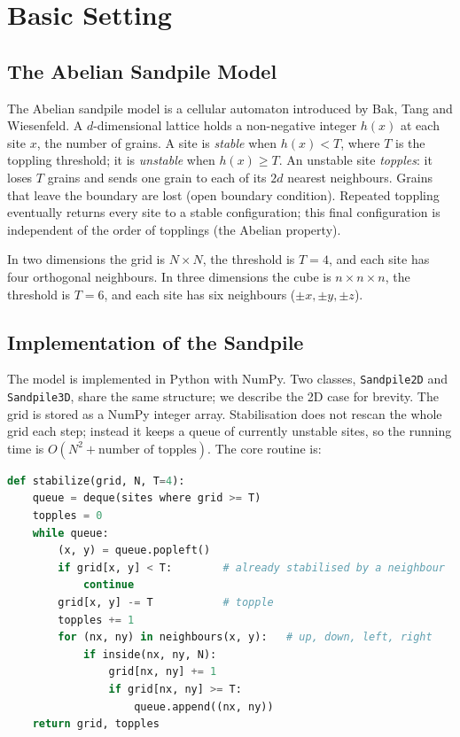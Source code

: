 \documentclass[main.tex]{subfiles}
\begin{document}
\pagestyle{plain}
\setcounter{chapter}{0}

\chapter{Basic Setting}
\label{chap:basic-setting}

\section{The Abelian Sandpile Model}

The Abelian sandpile model is a cellular automaton introduced by Bak, Tang and Wiesenfeld. A $d$-dimensional lattice holds a non-negative integer $h(x)$ at each site $x$, the number of grains. A site is \emph{stable} when $h(x) < T$, where $T$ is the toppling threshold; it is \emph{unstable} when $h(x) \ge T$. An unstable site \emph{topples}: it loses $T$ grains and sends one grain to each of its $2d$ nearest neighbours. Grains that leave the boundary are lost (open boundary condition). Repeated toppling eventually returns every site to a stable configuration; this final configuration is independent of the order of topplings (the Abelian property).

In two dimensions the grid is $N \times N$, the threshold is $T=4$, and each site has four orthogonal neighbours. In three dimensions the cube is $n \times n \times n$, the threshold is $T=6$, and each site has six neighbours ($\pm x,\pm y,\pm z$).

\section{Implementation of the Sandpile}
\label{sec:impl-sandpile}

The model is implemented in Python with NumPy. Two classes, \texttt{Sandpile2D} and \texttt{Sandpile3D}, share the same structure; we describe the 2D case for brevity. The grid is stored as a NumPy integer array. Stabilisation does not rescan the whole grid each step; instead it keeps a queue of currently unstable sites, so the running time is $O(N^2 + \text{number of topples})$. The core routine is:

\begin{lstlisting}[language=Python, caption={Stabilisation by queue (2D, simplified).}]
def stabilize(grid, N, T=4):
    queue = deque(sites where grid >= T)
    topples = 0
    while queue:
        (x, y) = queue.popleft()
        if grid[x, y] < T:        # already stabilised by a neighbour
            continue
        grid[x, y] -= T           # topple
        topples += 1
        for (nx, ny) in neighbours(x, y):   # up, down, left, right
            if inside(nx, ny, N):
                grid[nx, ny] += 1
                if grid[nx, ny] >= T:
                    queue.append((nx, ny))
    return grid, topples
\end{lstlisting}
\end{document}
